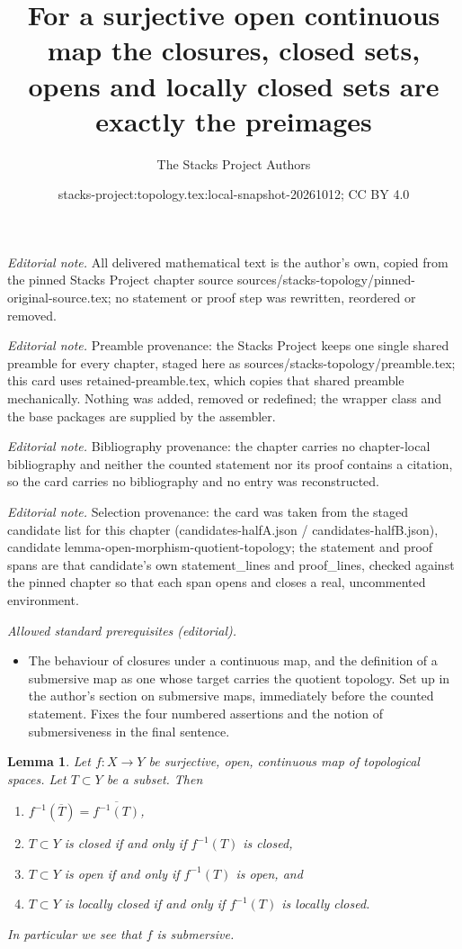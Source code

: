 \documentclass[10pt,a4paper]{amsart}
\title{For a surjective open continuous map the closures, closed sets, opens and locally closed sets are exactly the preimages}
\author{The Stacks Project Authors}
\date{stacks-project:topology.tex:local-snapshot-20261012; CC BY 4.0}
\theoremstyle{plain}
\newtheorem{lemma}[subsection]{Lemma}
\theoremstyle{definition}
\theoremstyle{remark}
\numberwithin{equation}{subsection}
\begin{document}
\maketitle
\noindent\textit{Editorial note.} All delivered mathematical text is the author's own, copied from the pinned Stacks Project chapter source sources/stacks-topology/pinned-original-source.tex; no statement or proof step was rewritten, reordered or removed.\par\medskip
\noindent\textit{Editorial note.} Preamble provenance: the Stacks Project keeps one single shared preamble for every chapter, staged here as sources/stacks-topology/preamble.tex; this card uses retained-preamble.tex, which copies that shared preamble mechanically. Nothing was added, removed or redefined; the wrapper class and the base packages are supplied by the assembler.\par\medskip
\noindent\textit{Editorial note.} Bibliography provenance: the chapter carries no chapter-local bibliography and neither the counted statement nor its proof contains a citation, so the card carries no bibliography and no entry was reconstructed.\par\medskip
\noindent\textit{Editorial note.} Selection provenance: the card was taken from the staged candidate list for this chapter (candidates-halfA.json / candidates-halfB.json), candidate lemma-open-morphism-quotient-topology; the statement and proof spans are that candidate's own statement\_lines and proof\_lines, checked against the pinned chapter so that each span opens and closes a real, uncommented environment.\par\medskip
\noindent\textit{Allowed standard prerequisites (editorial).}\begin{itemize}
\item The behaviour of closures under a continuous map, and the definition of a submersive map as one whose target carries the quotient topology. Set up in the author's section on submersive maps, immediately before the counted statement. Fixes the four numbered assertions and the notion of submersiveness in the final sentence.
\end{itemize}\medskip
\begin{lemma}
\label{lemma-open-morphism-quotient-topology}
Let $f : X \to Y$ be surjective, open, continuous map of topological spaces.
Let $T \subset Y$ be a subset. Then
\begin{enumerate}
\item $f^{-1}(\overline{T}) = \overline{f^{-1}(T)}$,
\item $T \subset Y$ is closed if and only if $f^{-1}(T)$ is closed,
\item $T \subset Y$ is open if and only if $f^{-1}(T)$ is open, and
\item $T \subset Y$ is locally closed if and only if $f^{-1}(T)$
is locally closed.
\end{enumerate}
In particular we see that $f$ is submersive.
\end{lemma}
\end{document}
